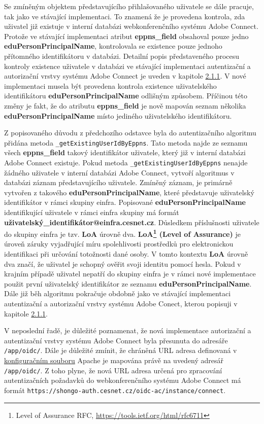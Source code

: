 \documentclass[
  printed, %
  twoside, %
  table,   %
  nolof,     %
  nolot,     %
]{fithesis3}
\begin{document}
Se zmíněným objektem představujícího přihlašovaného uživatele se dále pracuje, tak jako ve stávající implementaci. To znamená že je provedena kontrola, zda uživatel již existuje v interní databázi webkonferenčního systému Adobe Connect. Protože ve stávající implementaci atribut \textbf{eppns\_field} obsahoval pouze jedno \textbf{eduPersonPrincipalName}, kontrolovala se existence pouze jednoho přítomného identifikátoru v databázi. Detailní popis představeného procesu kontroly existence uživatele v databázi ve stávající implementaci autentizační a autorizační vrstvy systému Adobe Connect je uveden v kapitole \hyperref[ac-old]{2.1.1}. V nové implementaci musela být provedena kontrola existence uživatelského identifikátoru \textbf{eduPersonPrincipalName} odlišným způsobem. Příčinou této změny je fakt, že do atributu \textbf{eppns\_field} je nově mapován seznam několika \textbf{eduPersonPrincipalName} místo jediného uživatelského identifikátoru.
\par
Z popisovaného důvodu z předchozího odstavce byla do autentizačního algoritmu přidána metoda \texttt{\_getExistingUserIdByEppns}. Tato metoda najde ze seznamu všech \textbf{eppns\_field} takový identifikátor uživatele, který již v interní databázi Adobe Connect existuje. Pokud metoda \texttt{\_getExistingUserIdByEppns} nenajde žádného uživatele v interní databázi Adobe Connect, vytvoří algoritmus v databázi záznam představujícího uživatele. Zmíněný záznam, je primárně vytvořen z takového \textbf{eduPersonPrincipalName}, které představuje uživatelský identifikátor v rámci skupiny einfra. Popisované \textbf{eduPersonPrincipalName} identifikující uživatele v rámci einfra skupiny má formát \textbf{{uživatelský\_identifikátor}@einfra.cesnet.cz}. Důsledkem příslušnosti uživatele do skupiny einfra je tzv. \textbf{LoA} úrovně dva. \textbf{LoA\footnote{Level of Assurance RFC, \url{https://tools.ietf.org/html/rfc6711}} (Level of Assurance)} je úroveň záruky vyjadřující míru spolehlivosti prostředků pro
elektronickou identifikaci při určování totožnosti dané osoby. V tomto kontextu \textbf{LoA} úrovně dva značí, že uživatel je schopný ověřit svoji identitu pomocí hesla.  Pokud v krajním případě uživatel nepatří do skupiny einfra je v rámci nové implementace použit první uživatelský identifikátor ze seznamu \textbf{eduPersonPrincipalName}. Dále již běh algoritmu pokračuje obdobně jako ve stávající implementaci autentizační a autorizační vrstvy systému Adobe Conect, kterou popisuji v kapitole \hyperref[ac-old]{2.1.1}. 


\par 
V neposlední řadě, je důležité poznamenat, že nová implementace autorizační a autentizační vrstvy systému Adobe Connect byla přesunuta do adresáře \texttt{/app/oidc/}. Dále je důležité zmínit, že chráněná URL adresa definovaná v \hyperref[ac-location]{konfiguračním souboru} Apache je mapována právě na uvedený adresář \texttt{/app/oidc/}. Z toho plyne, že nová URL adresa určená pro zpracování autentizačních požadavků do webkonferenčního systému Adobe Connect má formát \texttt{https://shongo-auth.cesnet.cz/oidc-ac/instance/connect}.
\end{document}
